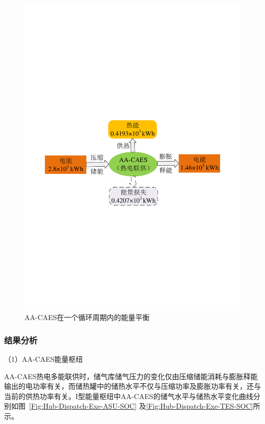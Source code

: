 \begin{figure}[H]
\centering
\includegraphics[scale=0.65]{figures/Chap4-15-Hub-Dispatch-AA-CAES-Flow-V2.pdf}
\caption{AA-CAES在一个循环周期内的能量平衡}
\label{Fig:Hub-Dispatch-AA-CAES-Flow}
\end{figure}

\subsubsection{结果分析}

（1）AA-CAES能量枢纽

AA-CAES热电多能联供时，储气库储气压力的变化仅由压缩储能消耗与膨胀释能输出的电功率有关，而储热罐中的储热水平不仅与压缩功率及膨胀功率有关，还与当前的供热功率有关。I型能量枢纽中AA-CAES的储气水平与储热水平变化曲线分别如图~\ref{Fig:Hub-Dispatch-Exe-ASU-SOC} 及\ref{Fig:Hub-Dispatch-Exe-TES-SOC}所示。

